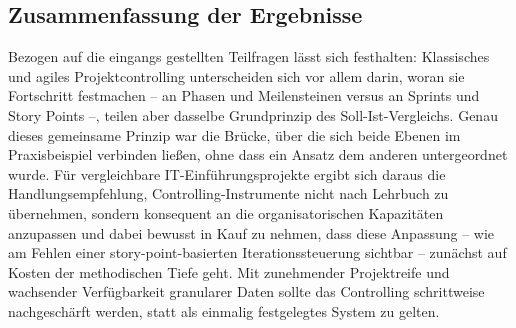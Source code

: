 \documentclass[
    12pt, 
    a4paper,
    ]{scrartcl} %
\begin{document}
\subsection{Zusammenfassung der Ergebnisse}

Bezogen auf die eingangs gestellten Teilfragen lässt sich festhalten: Klassisches und agiles Projektcontrolling unterscheiden sich vor allem darin, woran sie Fortschritt festmachen -- an Phasen und Meilensteinen versus an Sprints und Story Points --, teilen aber dasselbe Grundprinzip des Soll-Ist-Vergleichs. Genau dieses gemeinsame Prinzip war die Brücke, über die sich beide Ebenen im Praxisbeispiel verbinden ließen, ohne dass ein Ansatz dem anderen untergeordnet wurde. Für vergleichbare IT-Einführungsprojekte ergibt sich daraus die Handlungsempfehlung, Controlling-Instrumente nicht nach Lehrbuch zu übernehmen, sondern konsequent an die organisatorischen Kapazitäten anzupassen und dabei bewusst in Kauf zu nehmen, dass diese Anpassung -- wie am Fehlen einer story-point-basierten Iterationssteuerung sichtbar -- zunächst auf Kosten der methodischen Tiefe geht. Mit zunehmender Projektreife und wachsender Verfügbarkeit granularer Daten sollte das Controlling schrittweise nachgeschärft werden, statt als einmalig festgelegtes System zu gelten.

\end{document}
